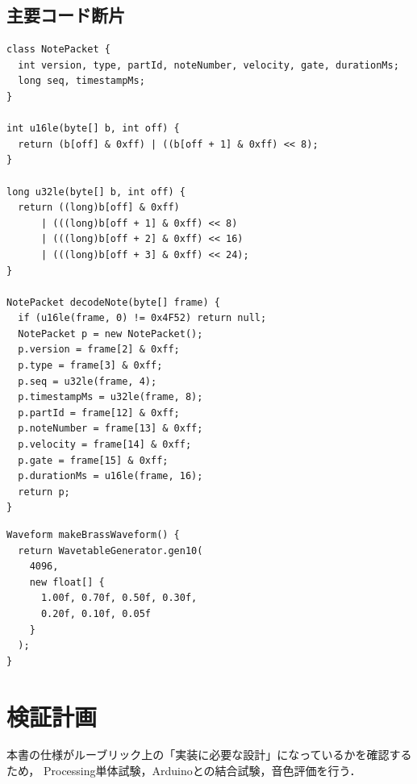 \documentclass[a4paper,11pt]{jsarticle}
\begin{document}
\subsection{主要コード断片}

\begin{lstlisting}[style=code, caption={NOTE復号の最小実装イメージ}]
class NotePacket {
  int version, type, partId, noteNumber, velocity, gate, durationMs;
  long seq, timestampMs;
}

int u16le(byte[] b, int off) {
  return (b[off] & 0xff) | ((b[off + 1] & 0xff) << 8);
}

long u32le(byte[] b, int off) {
  return ((long)b[off] & 0xff)
      | (((long)b[off + 1] & 0xff) << 8)
      | (((long)b[off + 2] & 0xff) << 16)
      | (((long)b[off + 3] & 0xff) << 24);
}

NotePacket decodeNote(byte[] frame) {
  if (u16le(frame, 0) != 0x4F52) return null;
  NotePacket p = new NotePacket();
  p.version = frame[2] & 0xff;
  p.type = frame[3] & 0xff;
  p.seq = u32le(frame, 4);
  p.timestampMs = u32le(frame, 8);
  p.partId = frame[12] & 0xff;
  p.noteNumber = frame[13] & 0xff;
  p.velocity = frame[14] & 0xff;
  p.gate = frame[15] & 0xff;
  p.durationMs = u16le(frame, 16);
  return p;
}
\end{lstlisting}

\begin{lstlisting}[style=code, caption={金管波形生成の実装イメージ}]
Waveform makeBrassWaveform() {
  return WavetableGenerator.gen10(
    4096,
    new float[] {
      1.00f, 0.70f, 0.50f, 0.30f,
      0.20f, 0.10f, 0.05f
    }
  );
}
\end{lstlisting}

\section{検証計画}

本書の仕様がルーブリック上の「実装に必要な設計」になっているかを確認するため，
Processing単体試験，Arduinoとの結合試験，音色評価を行う．
\end{document}
